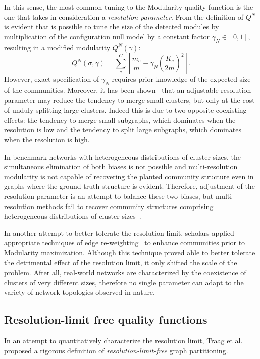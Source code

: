 In this sense, the most common tuning to the Modularity quality function is the one that takes in consideration a \emph{resolution parameter}.
From the definition of $Q^N$ is evident that is possible to tune the size of the detected modules by multiplication of the configuration null model by a constant factor $\gamma_{N} \in [0,1]$, resulting in a modified modularity $Q^N(\gamma)$:
\begin{equation}
Q^N(\sigma,\gamma) = \sum_c^C \left[ \frac{m_c}{m} - \gamma_{N} \left( \frac{K_c}{2m}\right)^2 \right].
\end{equation}
However, exact specification of $\gamma_{N}$ requires prior knowledge of the expected size of the communities.
Moreover, it has been shown~\cite{lancichinetti2011} that an adjustable resolution parameter may reduce the tendency to merge small clusters, but only at the cost of unduly splitting large clusters. 
Indeed this is due to two opposite coexisting effects: the tendency to merge small subgraphs, which dominates when the resolution is low and the tendency to split large subgraphs, which dominates when the resolution is high.

In benchmark networks with heterogeneous distributions of cluster sizes, the simultaneous elimination of both biases is not possible and multi-resolution modularity is not capable of recovering the planted community structure even in graphs where the ground-truth structure is evident.
Therefore, adjustment of the resolution parameter is an attempt to balance these two biases, but multi-resolution methods fail to recover community structures comprising heterogeneous distributions of cluster sizes~\cite{lancichinetti2011}. 

In another attempt to better tolerate the resolution limit, scholars applied appropriate techniques of edge re-weighting~\cite{berry2011} to enhance communities prior to Modularity maximization.
Although this technique proved able to better tolerate the detrimental effect of the resolution limit, it only shifted the scale of the problem.
After all, real-world networks are characterized by the coexistence of clusters of very different sizes, therefore no single parameter can adapt to the variety of network topologies observed in nature.

\subsection{Resolution-limit free quality functions}
In an attempt to quantitatively characterize the resolution limit, Traag et al.~\cite{traag2011} proposed a rigorous definition of \emph{resolution-limit-free} graph partitioning.

